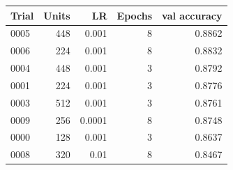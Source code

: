 \begin{tabular}{lrrrr}
\toprule
\textbf{Trial} & \textbf{Units} & \textbf{LR} & \textbf{Epochs} & \textbf{val accuracy} \\
\midrule
0005 & 448 & 0.001 & 8 & 0.8862 \\
0006 & 224 & 0.001 & 8 & 0.8832 \\
0004 & 448 & 0.001 & 3 & 0.8792 \\
0001 & 224 & 0.001 & 3 & 0.8776 \\
0003 & 512 & 0.001 & 3 & 0.8761 \\
0009 & 256 & 0.0001 & 8 & 0.8748 \\
0000 & 128 & 0.001 & 3 & 0.8637 \\
0008 & 320 & 0.01 & 8 & 0.8467 \\
\bottomrule
\end{tabular}
